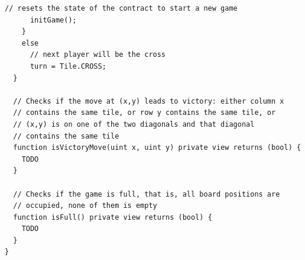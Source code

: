 \documentclass{article}
\begin{document}
\begin{lstlisting}[language=Solidity,numbers=none]
      // resets the state of the contract to start a new game
      initGame();
    }
    else
      // next player will be the cross
      turn = Tile.CROSS;
  }

  // Checks if the move at (x,y) leads to victory: either column x
  // contains the same tile, or row y contains the same tile, or
  // (x,y) is on one of the two diagonals and that diagonal
  // contains the same tile
  function isVictoryMove(uint x, uint y) private view returns (bool) {
    TODO
  }

  // Checks if the game is full, that is, all board positions are
  // occupied, none of them is empty
  function isFull() private view returns (bool) {
    TODO
  }
}
\end{lstlisting}
\end{document}
